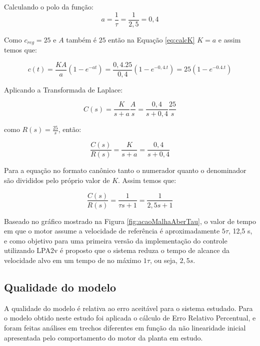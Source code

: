 Calculando o polo da função:
\begin{equation}
  a = \frac{1}{\tau} = \frac{1}{2,5} = 0,4
\end{equation}

Como $c_{reg} = 25$ e $A$ também é $25$ então na Equação \ref{eq:calcK} $K = a$ e assim temos que:

\begin{equation}
c(t) = \frac{KA}{a}(1-e^{-at}) = \frac{0,4.25}{0,4}(1-e^{-0,4.t}) = 25(1-e^{-0.4.t})
\end{equation}


Aplicando a Transformada de Laplace:

\begin{equation}
  C(s) = \frac{K}{s+a}\frac{A}{s} = \frac{0,4}{s+0,4}\frac{25}{s}
\end{equation}

como $R(s) = \frac{25}{s}$, então:

\begin{equation}
  \frac{C(s)}{R(s)} = \frac{K}{s+a} = \frac{0,4}{s+0,4}
\end{equation}



Para a equação no formato canônico tanto o numerador quanto o denominador são divididos pelo próprio valor de $K$. Assim temos que:

\begin{equation}
  \frac{C(s)}{R(s)} = \frac{1}{\tau s+1} = \frac{1}{2,5 s+1}
\end{equation}


Baseado no gráfico mostrado na Figura \ref{fig:acaoMalhaAberTau}, o valor de tempo em que o motor assume a velocidade de referência é aproximadamente $5\tau$, 12,5 s, e como objetivo para uma primeira versão da implementação do controle utilizando LPA2v é proposto que o sistema reduza o tempo de alcance da velocidade alvo em um tempo de no máximo $1\tau$, ou seja, $2,5 s$.


\subsection{ Qualidade do modelo }

A qualidade do modelo é relativa ao erro aceitável para o sistema estudado. Para o modelo obtido neste estudo foi aplicada o cálculo de Erro Relativo Percentual, e foram feitas análises em trechos diferentes em função da não linearidade inicial apresentada pelo comportamento do motor da planta em estudo.


